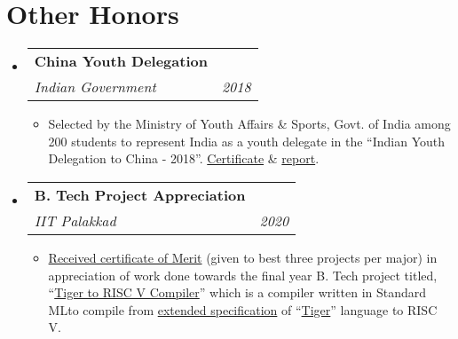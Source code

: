 \documentclass[letterpaper,11pt]{article}
\makeatletter
\newcommand{\resumeItem}[1]{
  \item{
    {#1 \vspace{-3pt}}
  }
}
\newcommand{\resumeSubheading}[4]{
  \vspace{-2pt}\item
    \begin{tabular*}{0.97\textwidth}[t]{l@{\extracolsep{\fill}}r}
      \textbf{#1} & #2 \\
      \textit{\small #3} & \textit{\small #4} \\
    \end{tabular*}\vspace{-7pt}
}
\newcommand{\resumeSubHeadingListStart}{\begin{itemize}[leftmargin=0.15in, label={}]}
\newcommand{\resumeSubHeadingListEnd}{\end{itemize}}
\newcommand{\resumeItemListStart}{\begin{itemize}}
\newcommand{\resumeItemListEnd}{\end{itemize}\vspace{-2pt}}
\makeatother
\begin{document}
\section{Other Honors} 
\resumeSubHeadingListStart
    \resumeSubheading
    {China Youth Delegation}{}
    {Indian Government}{2018}
      \resumeItemListStart
        \resumeItem{Selected by the Ministry of Youth Affairs \& Sports, Govt. of India among 200 students to represent India as a youth delegate in the ``Indian Youth Delegation to China - 2018''. \href{https://www.odrive.com/s/18d109df-fe3f-418f-ba0d-71d3dadc1cd7-623c6091}{Certificate} \& \href{https://www.odrive.com/s/e90e274f-6f34-466e-8a08-b8df892bcf4d-623c72e7}{report}.}
      \resumeItemListEnd
    \resumeSubheading
    {B. Tech Project Appreciation}{}
    {IIT Palakkad}{2020}
      \resumeItemListStart
        \resumeItem{\href{https://www.odrive.com/s/6db3947b-cb62-4a8f-90cd-056118248ec5-623c5499}{Received certificate of Merit} (given to best three projects per major) in appreciation of work done towards the final year B. Tech project titled, ``\href{https://github.com/sourabhxyz/btp}{Tiger to RISC V Compiler}'' which is a compiler written in Standard ML\footnotemark[2] to compile from \href{https://github.com/sourabhxyz/btp\#grammar-additions}{extended specification} of ``\href{https://www.cs.princeton.edu/~appel/modern/ml/}{Tiger}'' language to RISC V.}
      \resumeItemListEnd
\resumeSubHeadingListEnd




\end{document}
